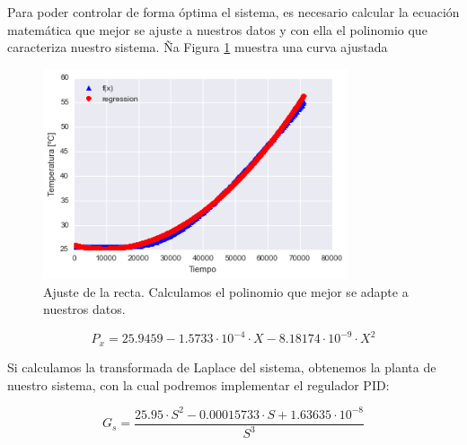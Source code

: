 Para poder controlar de forma óptima el sistema, es necesario calcular la ecuación matemática que mejor se ajuste a nuestros datos y con ella el polinomio que caracteriza nuestro sistema. Ña Figura \ref{fig:plc_lazo_abierto2} muestra una curva ajustada

\begin{figure}[H]
    \centering
    \includegraphics[width=0.8\textwidth]{images/PLC/modelado/modelado_13_1.png}
    \caption[Ajuste de la recta.]{Ajuste de la recta. Calculamos el polinomio que mejor se adapte a nuestros datos.}
    \label{fig:plc_lazo_abierto2}
\end{figure}

\begin{equation}
P_x=  25.9459 -1.5733 \cdot 10^{-4} \cdot X - 8.18174 \cdot 10^{-9} \cdot X^2
\end{equation}

Si calculamos la transformada de Laplace del sistema, obtenemos la planta de nuestro sistema, con la cual podremos implementar el regulador PID:

\begin{equation}
G_s = \frac{25.95 \cdot S^2 - 0.00015733 \cdot S + 1.63635 \cdot 10^{-8}}{S^3}
\end{equation}

 \\


